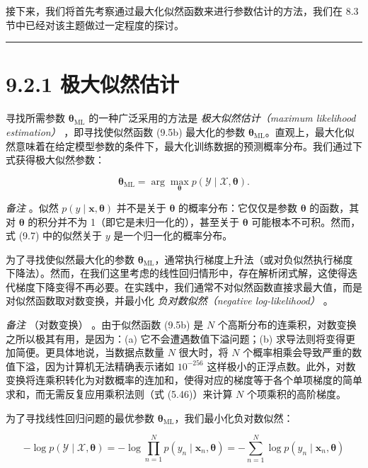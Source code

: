 接下来，我们将首先考察通过最大化似然函数来进行参数估计的方法，我们在 8.3 节中已经对该主题做过一定程度的探讨。

\medskip\hrule\medskip

\section*{9.2.1 极大似然估计}

寻找所需参数 $ \boldsymbol{\theta}_{\text{ML}} $ 的一种广泛采用的方法是 \emph{极大似然估计（maximum likelihood estimation）} ，即寻找使似然函数 (9.5b) 最大化的参数 $ \boldsymbol{\theta}_{\text{ML}} $。直观上，最大化似然意味着在给定模型参数的条件下，最大化训练数据的预测概率分布。我们通过下式获得极大似然参数：

\begin{equation}
\boldsymbol{\theta}_{\text{ML}} = \arg\max_{\boldsymbol{\theta}} p(\mathcal{Y} \mid \mathcal{X}, \boldsymbol{\theta}) .
\tag{9.7}
\end{equation}

\emph{备注} 。似然 $ p(y \mid \boldsymbol{x}, \boldsymbol{\theta}) $ 并不是关于 $ \boldsymbol{\theta} $ 的概率分布：它仅仅是参数 $ \boldsymbol{\theta} $ 的函数，其对 $ \boldsymbol{\theta} $ 的积分并不为 1（即它是未归一化的），甚至关于 $ \boldsymbol{\theta} $ 可能根本不可积。然而，式 (9.7) 中的似然关于 $ y $ 是一个归一化的概率分布。

为了寻找使似然最大化的参数 $ \boldsymbol{\theta}_{\text{ML}} $，通常执行梯度上升法（或对负似然执行梯度下降法）。然而，在我们这里考虑的线性回归情形中，存在解析闭式解，这使得迭代梯度下降变得不再必要。在实践中，我们通常不对似然函数直接求最大值，而是对似然函数取对数变换，并最小化 \emph{负对数似然（negative log-likelihood）} 。

\emph{备注} （对数变换） 。由于似然函数 (9.5b) 是 $ N $ 个高斯分布的连乘积，对数变换之所以极其有用，是因为：(a) 它不会遭遇数值下溢问题；(b) 求导法则将变得更加简便。更具体地说，当数据点数量 $ N $ 很大时，将 $ N $ 个概率相乘会导致严重的数值下溢，因为计算机无法精确表示诸如 $ 10^{-256} $ 这样极小的正浮点数。此外，对数变换将连乘积转化为对数概率的连加和，使得对应的梯度等于各个单项梯度的简单求和，而无需反复应用乘积法则（式 (5.46)）来计算 $ N $ 个项乘积的高阶梯度。

为了寻找线性回归问题的最优参数 $ \boldsymbol{\theta}_{\text{ML}} $，我们最小化负对数似然：

\begin{equation}
-\log p(\mathcal{Y} \mid \mathcal{X}, \boldsymbol{\theta}) = -\log \prod_{n=1}^N p(y_n \mid \boldsymbol{x}_n, \boldsymbol{\theta}) = -\sum_{n=1}^N \log p(y_n \mid \boldsymbol{x}_n, \boldsymbol{\theta})
\tag{9.8}
\end{equation}

